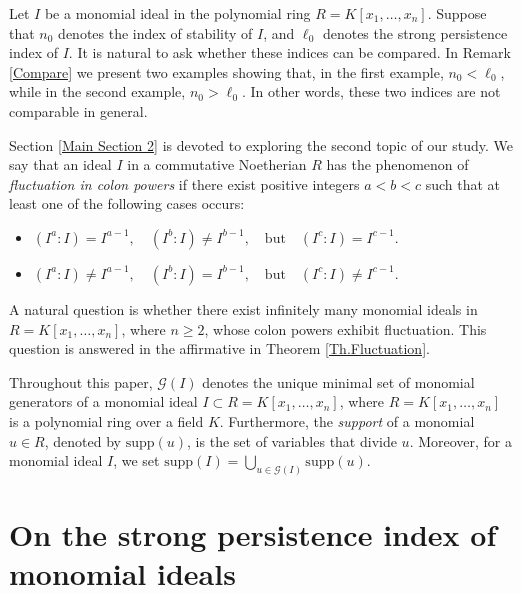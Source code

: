 \documentclass[11pt]{amsart}
\begin{document}
 Let \( I \) be a monomial ideal in the polynomial ring  \( R = K[x_1, \ldots, x_n] \). Suppose that \( n_0 \) denotes the 
index of stability of \( I \), and \( \ell_0 \) denotes the strong persistence index of \( I \). It is natural to ask whether these 
indices can be compared. In Remark \ref{Compare} we present two examples showing that, in the first example, \( n_0 < \ell_0 \), while in the 
second example, \( n_0 > \ell_0 \). In other words, these two indices are not comparable in general.

  
  Section   \ref{Main Section 2} is devoted to exploring the second topic of our study. We say that an ideal $I$  in a commutative  Noetherian $R$ 
  has the  phenomenon  of \textit{fluctuation in colon powers}
 if there exist  positive integers $a<b<c$ such that at least one of the following cases occurs:
\begin{itemize}
\item[(i)]  $(I^{a}:I) = I^{a-1}, \quad (I^{b}:I) \neq I^{b-1}, \quad \text{but} \quad (I^{c}:I) = I^{c-1}.$
\item[(ii)] $(I^{a}:I) \neq I^{a-1}, \quad (I^{b}:I) = I^{b-1}, \quad \text{but} \quad (I^{c}:I) \neq I^{c-1}.$
\end{itemize}
    A natural question is whether there exist infinitely many monomial ideals in $R=K[x_1, \ldots, x_n]$, where $n\geq 2$,  whose colon powers exhibit fluctuation. This question is answered in the affirmative in Theorem \ref{Th.Fluctuation}.  
  
  \bigskip
Throughout this paper,  $\mathcal{G}(I)$ denotes the unique minimal set of monomial generators of a monomial ideal $I\subset R=K[x_1, \ldots, x_n]$, where 
$R=K[x_1, \ldots, x_n]$ is  a polynomial  ring over a field $K$. Furthermore, the {\em support} of a monomial $u\in R$, denoted by $\mathrm{supp}(u)$, is the set of variables that divide $u$.  Moreover, for a monomial ideal $I$, we set $\mathrm{supp}(I)=\bigcup_{u \in \mathcal{G}(I)}\mathrm{supp}(u)$. 

  

\section{On the strong persistence index  of monomial ideals} \label{Main Section 1}
\end{document}
